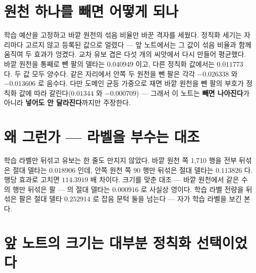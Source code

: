 \section{원천 하나를 빼면 어떻게 되나}


학습 예산을 고정하고 바깥 원천의 섞음 비율만 바꾼 격자를 세웠다. 정칙화 세기는 자리마다 고르지 않고 등록된 값으로 얼렸다 --- 앞 노트에서는 그 값이 섞음 비율과 함께 움직여 두 효과가 엉켰다. 교차 유보 겹은 다섯 개의 씨앗에서 다시 만들어 평균했다. 바깥 원천을 통째로 뺀 팔의 델타는 $0.040949$ 이고, 다른 정칙화 값에서는 $0.011773$ 다. 두 값 모두 양수다. 같은 자리에서 안쪽 두 원천을 뺀 팔은 각각 $-0.026338$ 와 $-0.013606$ 로 음수다. 다만 도메인 균등 가중으로 재면 바깥 원천을 뺀 팔의 부호가 정칙화 값에 따라 갈린다($0.01344$ 와 $-0.000709$) --- 그래서 이 노트는 \textbf{빼면 나아진다}가 아니라 \textbf{넣어도 안 달라진다}까지만 주장한다.

\section{왜 그런가 --- 라벨을 부수는 대조}


학습 라벨만 뒤섞고 유보는 한 줄도 만지지 않았다. 바깥 원천 쪽 1,710 행을 전부 뒤섞은 절대 델타는 $0.018906$ 인데, 안쪽 원천 쪽 90 행만 뒤섞은 절대 델타는 $0.113826$ 다. 행당 효과로 고치면 $114.3919$ 배 차이다. 크기를 맞춘 대조 --- 바깥 원천에서 같은 수의 행만 뒤섞은 팔 --- 의 절대 델타는 $0.000916$ 로 사실상 영이다. 학습 라벨 전량을 뒤섞은 팔은 절대 델타 $0.252914$ 로 잡음 문턱 둘을 넘는다 --- 자가 학습 라벨을 보긴 본다.

\section{앞 노트의 크기는 대부분 정칙화 선택이었다}


